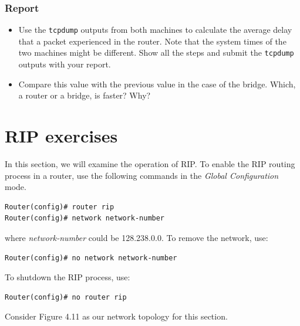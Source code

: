\documentclass{../UTNetLab}
\begin{document}
    \subsubsection*{Report}
    \begin{itemize}
        \item Use the \lstinline{tcpdump} outputs from both machines to calculate the average delay that a packet experienced in the router. Note that the system times of the two machines might be different. Show all the steps and submit the \lstinline{tcpdump} outputs with your report.
        \item Compare this value with the previous value in the case of the bridge. Which, a router or a bridge, is faster? Why?
    \end{itemize}


\section*{RIP exercises}
    In this section, we will examine the operation of RIP. To enable the RIP routing process in a router, use the following commands in the \textit{Global Configuration} mode.
    \begin{lstlisting}[language={cisco}, emph={network-number}]
Router(config)# router rip
Router(config)# network network-number
    \end{lstlisting}
    where \textit{network-number} could be 128.238.0.0.
    To remove the network, use:
    \begin{lstlisting}[language={cisco}, emph={network-number}]
Router(config)# no network network-number
    \end{lstlisting}
    To shutdown the RIP process, use:
    \begin{lstlisting}[language={cisco}]
Router(config)# no router rip
    \end{lstlisting}
    Consider Figure 4.11 as our network topology for this section.
    
\end{document}
